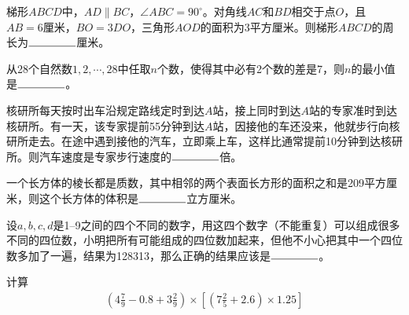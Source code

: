 \begin{question}
  梯形$ABCD$中，$AD\parallel BC$，$\angle ABC=90^\circ$。对角线$AC$和$BD$相交于点$O$，且$AB=6$厘米，$BO=3DO$，三角形$AOD$的面积为3平方厘米。则梯形$ABCD$的周长为$\blankline$厘米。

  \begin{center}
  \end{center}
\end{question}


\begin{question}
  从28个自然数$1,2,\cdots,28$中任取$n$个数，使得其中必有2个数的差是7，则$n$的最小值是$\blankline$。
\end{question}



\begin{question}
  核研所每天按时出车沿规定路线定时到达$A$站，接上同时到达$A$站的专家准时到达核研所。有一天，该专家提前55分钟到达$A$站，因接他的车还没来，他就步行向核研所走去。在途中遇到接他的汽车，立即乘上车，这样比通常提前10分钟到达核研所。则汽车速度是专家步行速度的$\blankline$倍。
\end{question}


\begin{question}
  一个长方体的棱长都是质数，其中相邻的两个表面长方形的面积之和是209平方厘米，则这个长方体的体积是$\blankline$立方厘米。
\end{question}


\begin{question}
  设$a,b,c,d$是1--9之间的四个不同的数字，用这四个数字（不能重复）可以组成很多不同的四位数，小明把所有可能组成的四位数加起来，但他不小心把其中一个四位数多加了一遍，结果为128313，那么正确的结果应该是$\blankline$。
\end{question}


\begin{question}
  计算
  \begin{align*}
    \left( 4\frac79 - 0.8 + 3\frac29 \right) \times
    \left[ \left( 7\frac25 + 2.6 \right) \times 1.25 \right]
  \end{align*}
\end{question}



